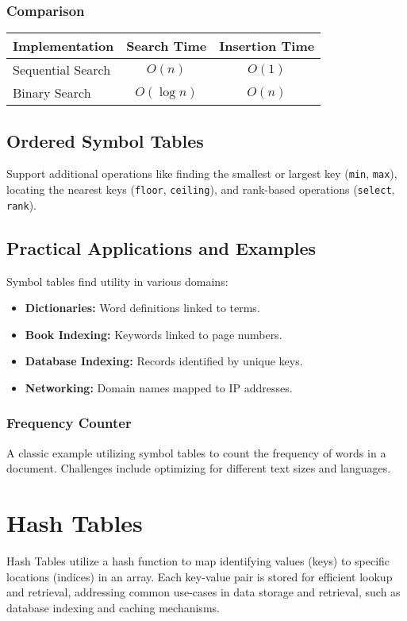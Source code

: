 \documentclass{article}
\begin{document}
\subsubsection*{Comparison}
\begin{tabular}{|l|c|c|}
\hline
\textbf{Implementation} & \textbf{Search Time} & \textbf{Insertion Time} \\
\hline
Sequential Search & $O(n)$ & $O(1)$ \\
Binary Search & $O(\log n)$ & $O(n)$ \\
\hline
\end{tabular}

\subsection{Ordered Symbol Tables}
Support additional operations like finding the smallest or largest key (\texttt{min}, \texttt{max}), locating the nearest keys (\texttt{floor}, \texttt{ceiling}), and rank-based operations (\texttt{select}, \texttt{rank}).

\subsection{Practical Applications and Examples}
Symbol tables find utility in various domains:
\begin{itemize}
    \item \textbf{Dictionaries:} Word definitions linked to terms.
    \item \textbf{Book Indexing:} Keywords linked to page numbers.
    \item \textbf{Database Indexing:} Records identified by unique keys.
    \item \textbf{Networking:} Domain names mapped to IP addresses.
\end{itemize}

\subsubsection*{Frequency Counter}
A classic example utilizing symbol tables to count the frequency of words in a document. Challenges include optimizing for different text sizes and languages.

\section{Hash Tables}

Hash Tables utilize a hash function to map identifying values (keys) to specific locations (indices) in an array. Each key-value pair is stored for efficient lookup and retrieval, addressing common use-cases in data storage and retrieval, such as database indexing and caching mechanisms.
\end{document}
